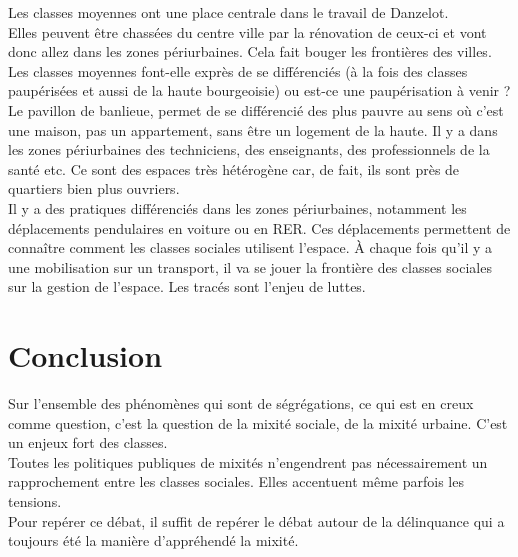 \documentclass[10pt, a4paper, openany]{book}
\begin{document}
Les classes moyennes ont une place centrale dans le travail de Danzelot. \\
Elles peuvent être chassées du centre ville par la rénovation de ceux-ci et vont donc allez dans les zones périurbaines. Cela fait bouger les frontières des villes. \\
Les classes moyennes font-elle exprès de se différenciés (à la fois des classes paupérisées et aussi de la haute bourgeoisie) ou est-ce une paupérisation à venir ? \\
Le pavillon de banlieue, permet de se différencié des plus pauvre au sens où c'est une maison, pas un appartement, sans être un logement de la haute. Il y a dans les zones périurbaines des techniciens, des enseignants, des professionnels de la santé etc. Ce sont des espaces très hétérogène car, de fait, ils sont près de quartiers bien plus ouvriers. \\
Il y a des pratiques différenciés dans les zones périurbaines, notamment les déplacements pendulaires en voiture ou en RER. Ces déplacements permettent de connaître comment les classes sociales utilisent l'espace. À chaque fois qu'il y a une mobilisation sur un transport, il va se jouer la frontière des classes sociales sur la gestion de l'espace. Les tracés sont l'enjeu de luttes.

\section{Conclusion}

Sur l'ensemble des phénomènes qui sont de ségrégations, ce qui est en creux comme question, c'est la question de la mixité sociale, de la mixité urbaine. C'est un enjeux fort des classes. \\
Toutes les politiques publiques de mixités n'engendrent pas nécessairement un rapprochement entre les classes sociales. Elles accentuent même parfois les tensions. \\
Pour repérer ce débat, il suffit de repérer le débat autour de la délinquance qui a toujours été la manière d'appréhendé la mixité. 
\end{document}
